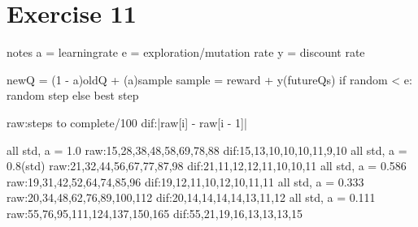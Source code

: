 \section{Exercise 11}
notes
a = learningrate
e = exploration/mutation rate
y = discount rate

newQ = (1 - a)oldQ + (a)sample
sample = reward + y(futureQs)
if random < e: random step
else best step

raw:steps to complete/100
dif:|raw[i] - raw[i - 1]|

all std, a = 1.0
raw:15,28,38,48,58,69,78,88
dif:15,13,10,10,10,11,9,10
all std, a = 0.8(std)
raw:21,32,44,56,67,77,87,98
dif:21,11,12,12,11,10,10,11
all std, a = 0.586
raw:19,31,42,52,64,74,85,96
dif:19,12,11,10,12,10,11,11
all std, a = 0.333
raw:20,34,48,62,76,89,100,112
dif:20,14,14,14,14,13,11,12
all std, a = 0.111
raw:55,76,95,111,124,137,150,165
dif:55,21,19,16,13,13,13,15